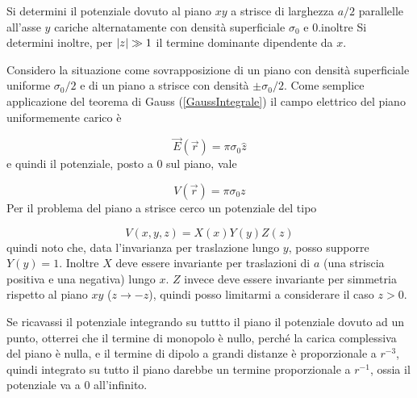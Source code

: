 \documentclass[../main.tex]{subfiles}
\begin{document}

\textex

Si determini il potenziale dovuto al piano $xy$ a strisce di larghezza $a/2$ parallelle all'asse $y$ cariche alternatamente con densità superficiale $\sigma_0$  e $0$.\newline inoltre
Si determini inoltre, per $\lvert z\rvert \gg 1$ il termine dominante dipendente da $x$.

\solution
Considero la situazione come sovrapposizione di un piano con densità superficiale uniforme $\sigma_0/2$ e di un piano a strisce con densità $\pm \sigma_0/2$.
Come semplice applicazione del teorema di Gauss (\cref{GaussIntegrale}) il campo elettrico del piano uniformemente carico è

\begin{equation*}
  \vec E (\vec r)= \pi \sigma_0 \hat z 
\end{equation*}
e quindi il potenziale, posto a $0$ sul piano, vale

\begin{equation}
  \label{pz:potenzialeuniforme}
  V(\vec r)= \pi \sigma_0 z
\end{equation}
Per il problema del piano a strisce cerco un potenziale del tipo

\begin{equation*}
  V(x, y, z)=X(x)Y(y)Z(z)
\end{equation*}
quindi noto che, data l'invarianza per traslazione lungo $y$, posso supporre $Y(y)=1$.
Inoltre $X$ deve essere invariante per traslazioni di $a$ (una striscia positiva e una negativa) lungo $x$.
$Z$ invece deve essere invariante per simmetria rispetto al piano $xy$ ($z \to -z$), quindi posso limitarmi a considerare il caso $z > 0$.

Se ricavassi il potenziale integrando su tuttto il piano il potenziale dovuto ad un punto, otterrei che il termine di monopolo \`e nullo, perch\'e la carica complessiva del piano \`e nulla, %
e il termine di dipolo a grandi distanze \`e proporzionale a $r^{-3}$, quindi integrato su tutto il piano darebbe un termine proporzionale a $r^{-1}$, ossia il potenziale va a $0$ all'infinito.
\end{document}
